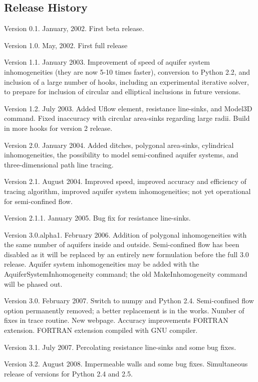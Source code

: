 \documentclass [10pt,letterpaper] {article}
\begin{document}
\subsection{Release History} \begin{description}
\item Version 0.1. January,
2002. First beta release.
\item Version 1.0. May, 2002. First full release
\item Version 1.1. January 2003. Improvement of speed of aquifer system
inhomogeneities (they are now 5-10 times faster), conversion to Python 2.2,
and inclusion of a large number of hooks, including an experimental iterative
solver, to prepare for inclusion of circular and elliptical inclusions in
future versions.
\item Version 1.2. July 2003. Added Uflow element, resistance
line-sinks, and Model3D command. Fixed inaccuracy with circular area-sinks
regarding large radii. Build in more hooks for version 2 release.
\item
Version 2.0. January 2004. Added ditches, polygonal area-sinks, cylindrical
inhomogeneities, the possibility to model semi-confined aquifer systems, and
three-dimensional path line tracing.
\item Version 2.1. August 2004. Improved
speed, improved accuracy and efficiency of tracing algorithm, improved aquifer
system inhomogeneities; not yet operational for semi-confined flow.
\item
Version 2.1.1. January 2005. Bug fix for resistance line-sinks.
\item Version
3.0.alpha1. February 2006. Addition of polygonal inhomogeneities with the same
number of aquifers inside and outside. Semi-confined flow has been disabled as
it will be replaced by an entirely new formulation before the full 3.0
release. Aquifer system inhomogeneities may be added with the
AquiferSystemInhomogeneity command; the old MakeInhomogeneity command will be
phased out.
\item Version 3.0. February 2007. Switch to numpy and Python 2.4. Semi-confined
flow option permanently removed; a better replacement is in the works. Number
of fixes in trace routine. New webpage. Accuracy improvements FORTRAN extension.
FORTRAN extension compiled with GNU compiler.
\item Version 3.1. July 2007. Percolating resistance line-sinks and some bug fixes.
\item Version 3.2. August 2008. Impermeable walls and some bug fixes. Simultaneous release of versions for Python 2.4 and 2.5.

\end{description}
\end{document}
